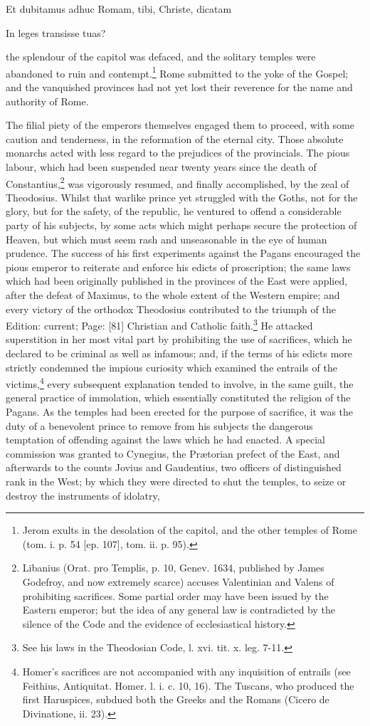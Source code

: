 {Et dubitamus adhuc Romam, tibi, Christe, dicatam

In leges transisse tuas?} the splendour of the capitol was defaced, and the solitary temples were abandoned to ruin and contempt.\footnote{Jerom exults in the desolation of the capitol, and the other temples of Rome (tom. i. p. 54 [ep. 107], tom. ii. p. 95).} Rome submitted to the yoke of the Gospel; and the vanquished provinces had not yet lost their reverence for the name and authority of Rome.

The filial piety of the emperors themselves engaged them to proceed, with some caution and tenderness, in the reformation of the eternal city. Those absolute monarchs acted with less regard to the prejudices of the provincials. The pious labour, which had been suspended near twenty years since the death of Constantius,\footnote{Libanius (Orat. pro Templis, p. 10, Genev. 1634, published by James Godefroy, and now extremely scarce) accuses Valentinian and Valens of prohibiting sacrifices. Some partial order may have been issued by the Eastern emperor; but the idea of any general law is contradicted by the silence of the Code and the evidence of ecclesiastical history.} was vigorously resumed, and finally accomplished, by the zeal of Theodosius. Whilst that warlike prince yet struggled with the Goths, not for the glory, but for the safety, of the republic, he ventured to offend a considerable party of his subjects, by some acts which might perhaps secure the protection of Heaven, but which must seem rash and unseasonable in the eye of human prudence. The success of his first experiments against the Pagans encouraged the pious emperor to reiterate and enforce his edicts of proscription; the same laws which had been originally published in the provinces of the East were applied, after the defeat of Maximus, to the whole extent of the Western empire; and every victory of the orthodox Theodosius contributed to the triumph of the Edition: current; Page: [81] Christian and Catholic faith.\footnote{See his laws in the Theodosian Code, l. xvi. tit. x. leg. 7-11.} He attacked superstition in her most vital part by prohibiting the use of sacrifices, which he declared to be criminal as well as infamous; and, if the terms of his edicts more strictly condemned the impious curiosity which examined the entrails of the victims,\footnote{Homer\texthebrew{}’s sacrifices are not accompanied with any inquisition of entrails (see Feithius, Antiquitat. Homer. l. i. c. 10, 16). The Tuscans, who produced the first Haruspices, subdued both the Greeks and the Romans (Cicero de Divinatione, ii. 23).} every subsequent explanation tended to involve, in the same guilt, the general practice of immolation, which essentially constituted the religion of the Pagans. As the temples had been erected for the purpose of sacrifice, it was the duty of a benevolent prince to remove from his subjects the dangerous temptation of offending against the laws which he had enacted. A special commission was granted to Cynegius, the Prætorian prefect of the East, and afterwards to the counts Jovius and Gaudentius, two officers of distinguished rank in the West; by which they were directed to shut the temples, to seize or destroy the instruments of idolatry, 